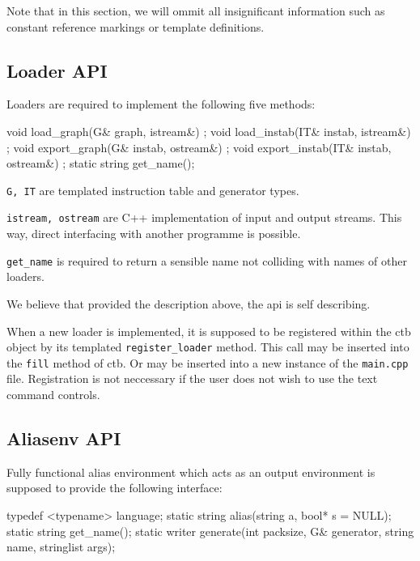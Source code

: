 Note that in this section, we will ommit all insignificant information such as constant reference markings or template definitions.

\subsection{Loader API}

Loaders are required to implement the following five methods:

\begin{code}
void load_graph(G& graph, istream&) ;
void load_instab(IT& instab, istream&) ;
void export_graph(G& instab, ostream&) ;
void export_instab(IT& instab, ostream&) ;
static string get_name();
\end{code}

\begin{description}
\item \texttt{G, IT} are templated instruction table and generator types.
\item \texttt{istream, ostream} are C++ implementation of input and output streams. This way, direct interfacing with another programme is possible.
\item \texttt{get\_name} is required to return a sensible name not colliding with names of other loaders.
\end{description}

We believe that provided the description above, the api is self describing.

When a new loader is implemented, it is supposed to be registered within the ctb object by its templated \texttt{register\_loader} method. This call may be inserted into the \texttt{fill} method of ctb. Or may be inserted into a new instance of the \texttt{main.cpp} file. Registration is not neccessary if the user does not wish to use the text command controls.

\subsection{Aliasenv API}

Fully functional alias environment which acts as an output environment is supposed to provide the following interface:

\begin{code}
typedef <typename> language;
static string alias(string a, bool* s = NULL);
static string get_name();
static writer generate(int packsize,  G& generator, 
  string name, stringlist args);
\end{code}

